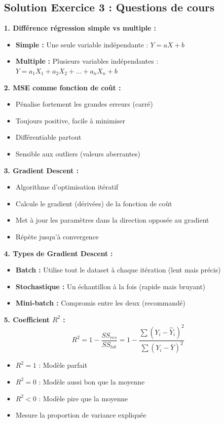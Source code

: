 \documentclass[11pt,a4paper]{article}
\begin{document}
\subsection{Solution Exercice 3 : Questions de cours}

\begin{solutionbox}
\textbf{1. Différence régression simple vs multiple :}
\begin{itemize}
    \item \textbf{Simple :} Une seule variable indépendante : $Y = aX + b$
    \item \textbf{Multiple :} Plusieurs variables indépendantes : $Y = a_1X_1 + a_2X_2 + ... + a_nX_n + b$
\end{itemize}

\textbf{2. MSE comme fonction de coût :}
\begin{itemize}
    \item Pénalise fortement les grandes erreurs (carré)
    \item Toujours positive, facile à minimiser
    \item Différentiable partout
    \item Sensible aux outliers (valeurs aberrantes)
\end{itemize}

\textbf{3. Gradient Descent :}
\begin{itemize}
    \item Algorithme d'optimisation itératif
    \item Calcule le gradient (dérivées) de la fonction de coût
    \item Met à jour les paramètres dans la direction opposée au gradient
    \item Répète jusqu'à convergence
\end{itemize}

\textbf{4. Types de Gradient Descent :}
\begin{itemize}
    \item \textbf{Batch :} Utilise tout le dataset à chaque itération (lent mais précis)
    \item \textbf{Stochastique :} Un échantillon à la fois (rapide mais bruyant)
    \item \textbf{Mini-batch :} Compromis entre les deux (recommandé)
\end{itemize}

\textbf{5. Coefficient $R^2$ :}
$$R^2 = 1 - \frac{SS_{res}}{SS_{tot}} = 1 - \frac{\sum(Y_i - \hat{Y}_i)^2}{\sum(Y_i - \bar{Y})^2}$$
\begin{itemize}
    \item $R^2 = 1$ : Modèle parfait
    \item $R^2 = 0$ : Modèle aussi bon que la moyenne
    \item $R^2 < 0$ : Modèle pire que la moyenne
    \item Mesure la proportion de variance expliquée
\end{itemize}


\end{solutionbox}
\end{document}
